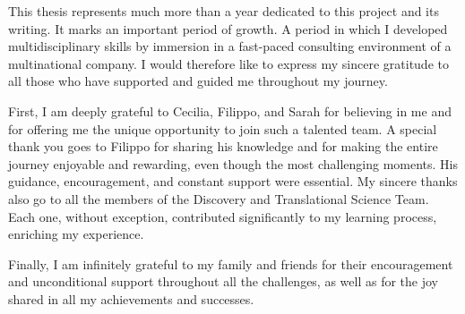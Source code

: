 
%

\begin{ntacknowledgements}

This thesis represents much more than a year dedicated to this project and its writing. It marks an important period of growth. A period in which I developed multidisciplinary skills by immersion in a fast-paced consulting environment of a multinational company. I would therefore like to express my sincere gratitude to all those who have supported and guided me throughout my journey. 

First, I am deeply grateful to Cecilia, Filippo, and Sarah for believing in me and for offering me the unique opportunity to join such a talented team. A special thank you goes to Filippo for sharing his knowledge and for making the entire journey enjoyable and rewarding, even though the most challenging moments. His guidance, encouragement, and constant support were essential. My sincere thanks also go to all the members of the Discovery and Translational Science Team. Each one, without exception, contributed significantly to my learning process, enriching my experience.

Finally, I am infinitely grateful to my family and friends for their encouragement and unconditional support throughout all the challenges, as well as for the joy shared in all my achievements and successes.


\end{ntacknowledgements}